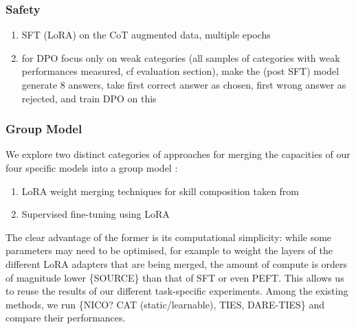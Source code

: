 \documentclass[11pt]{article}
\begin{document}
\subsubsection{Safety}

\begin{enumerate}
    \item SFT (LoRA) on the CoT augmented data, multiple epochs
    \item for DPO focus only on weak categories (all samples of categories with weak performances measured, cf evaluation section), make the (post SFT) model generate 8 answers, take first correct answer as chosen, first wrong answer as rejected, and train DPO on this
\end{enumerate}


\subsubsection{Group Model}

We explore two distinct categories of approaches for merging the capacities of our four specific models into a group model : 
\begin{enumerate}
    \item LoRA weight merging techniques for skill composition taken from \citeauthor{prabhakar2024lorasoupsmergingloras}
    \item Supervised fine-tuning using LoRA 
\end{enumerate}

The clear advantage of the former is its computational simplicity: while some parameters may need to be optimised, for example to weight the layers of the different LoRA adapters that are being merged, the amount of compute is orders of magnitude lower \{SOURCE\} than that of SFT or even PEFT. This allows us to reuse the results of our different task-specific experiments. Among the existing methods, we run \{NICO? CAT (static/learnable), TIES, DARE-TIES\} and compare their performances.
\end{document}
